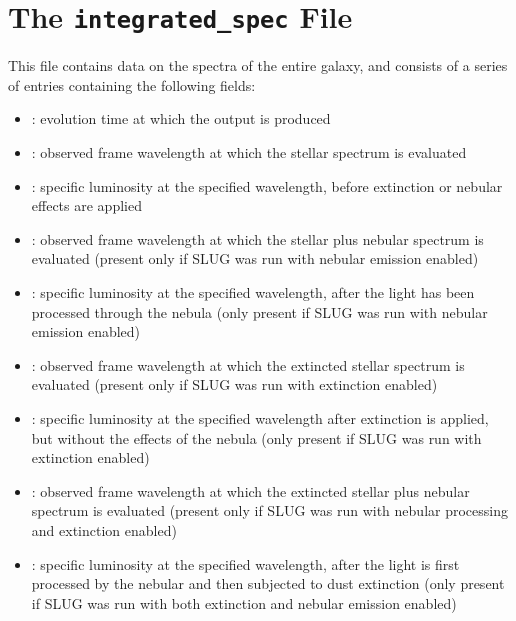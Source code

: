 \documentclass[letterpaper,10pt,english]{sphinxmanual}
\begin{document}
\section{The \texttt{integrated\_spec} File}
\label{output:the-integrated-spec-file}\label{output:ssec-int-spec-file}
This file contains data on the spectra of the entire galaxy, and consists of a series of entries containing the following fields:
\begin{itemize}
\item {} 
: evolution time at which the output is produced

\item {} 
: observed frame wavelength at which the stellar spectrum is evaluated

\item {} 
: specific luminosity at the specified wavelength, before extinction or nebular effects are applied

\item {} 
: observed frame wavelength at which the stellar plus nebular spectrum is evaluated (present only if SLUG was run with nebular emission enabled)

\item {} 
: specific luminosity at the specified wavelength, after the light has been processed through the nebula (only present if SLUG was run with nebular emission enabled)

\item {} 
: observed frame wavelength at which the extincted stellar spectrum is evaluated (present only if SLUG was run with extinction enabled)

\item {} 
: specific luminosity at the specified wavelength after extinction is applied, but without the effects of the nebula (only present if SLUG was run with extinction enabled)

\item {} 
: observed frame wavelength at which the extincted stellar plus nebular spectrum is evaluated (present only if SLUG was run with nebular processing and  extinction enabled)

\item {} 
: specific luminosity at the specified wavelength, after the light is first processed by the nebular and then subjected to dust extinction (only present if SLUG was run with both extinction and nebular emission enabled)

\end{itemize}
\end{document}
